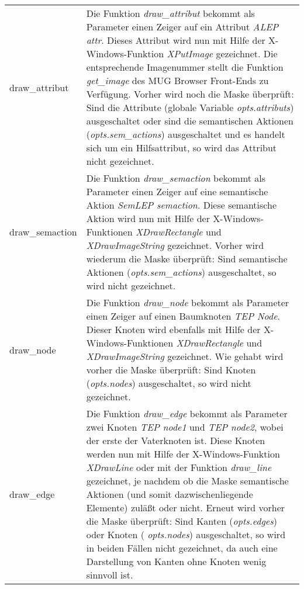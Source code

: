 \begin{tabular}{|l|p{9.0cm}|}
\hline
draw\_attribut & Die Funktion {\it draw\_attribut} bekommt als Parameter
einen Zeiger auf ein Attribut {\it ALEP attr}. Dieses Attribut wird nun mit Hilfe der X-Windows-Funktion {\it XPutImage} gezeichnet. Die entsprechende
Imagenummer stellt die Funktion {\it get\_image} des MUG Browser Front-Ends zu Verf\"ugung. Vorher wird noch die Maske \"uberpr\"uft: Sind die Attribute
(globale Variable {\it opts.attributs}) ausgeschaltet oder sind die semantischen Aktionen ({\it opts.sem\_actions}) ausgeschaltet und es handelt sich
um ein Hilfsattribut, so wird das Attribut nicht gezeichnet.\\
draw\_semaction & Die Funktion {\it draw\_semaction} bekommt als
Parameter einen Zeiger auf eine semantische Aktion {\it SemLEP semaction}. Diese semantische Aktion wird nun mit Hilfe der X-Windows-Funktionen {\it
XDrawRectangle} und {\it XDrawImageString} gezeichnet. Vorher wird wiederum die Maske \"uberpr\"uft: Sind semantische Aktionen ({\it opts.sem\_actions})
ausgeschaltet, so wird nicht gezeichnet. \\
draw\_node & Die Funktion {\it draw\_node} bekommt als Parameter einen Zeiger auf einen Baumknoten {\it
TEP Node}. Dieser Knoten wird ebenfalls mit Hilfe der X-Windows-Funktionen {\it XDrawRectangle} und {\it XDrawImageString} gezeichnet. Wie gehabt wird
vorher die Maske \"uberpr\"uft: Sind Knoten ({\it opts.nodes}) ausgeschaltet, so wird nicht gezeichnet. \\
draw\_edge & Die Funktion {\it draw\_edge}
bekommt als Parameter zwei Knoten {\it TEP node1} und {\it TEP node2}, wobei der erste der Vaterknoten ist. Diese Knoten werden nun mit Hilfe der
X-Windows-Funktion {\it XDrawLine} oder mit der Funktion {\it draw\_line} gezeichnet, je nachdem ob die Maske semantische Aktionen
(und somit dazwischenliegende Elemente) zul\"a\ss{}t oder nicht. Erneut wird vorher die Maske \"uberpr\"uft: Sind Kanten ({\it opts.edges}) oder Knoten ({\it
opts.nodes}) ausgeschaltet, so wird in beiden F\"allen nicht gezeichnet, da auch eine Darstellung von Kanten ohne Knoten wenig sinnvoll ist. \\
\hline
\end{tabular}

